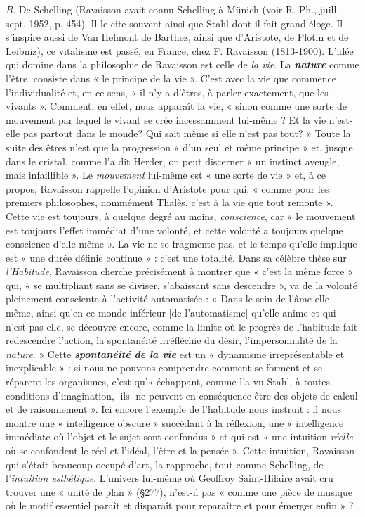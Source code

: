 {\it B.} De Schelling
{\scriptsize (Ravaisson avait connu Schelling à Münich (voir R. Ph., juill.-sept. 1952, p. 454).
Il le cite souvent ainsi que Stahl dont il fait grand éloge. Il s’inspire aussi de Van Helmont
de Barthez, ainsi que d’Aristote, de Plotin et de Leibniz)},
ce vitalisme est passé, en France, chez F. Ravaisson
(1813-1900). L'idée qui domine dans la philosophie de Ravaisson
est celle de {\it la vie}. La \textbf{\textit {nature}} comme l’être, consiste dans « le principe
de la vie ». C’est avec la vie que commence l’individualité et, en ce
sens, « il n’y a d’êtres, à parler exactement, que les vivants ». Comment,
en effet, nous apparaît la vie, « sinon comme une sorte de mouvement
par lequel le vivant se crée incessamment lui-même ? Et la vie
n'est-elle pas partout dans le monde? Qui sait même si elle n’est pas
tout? » Toute la suite des êtres n’est que la progression « d’un seul et
même principe » et, jusque dans le cristal, comme l’a dit Herder, on
peut discerner « un instinct aveugle, mais infaillible ». Le {\it mouvement}
lui-même est « une sorte de vie » et, à ce propos, Ravaisson rappelle
l’opinion d’Aristote pour qui, « comme pour les premiers philosophes,
nommément Thalès, c’est à la vie que tout remonte ». Cette vie est
toujours, à quelque degré au moins, {\it conscience}, car « le mouvement
est toujours l'effet immédiat d’une volonté, et cette volonté a toujours
quelque conscience d’elle-même ». La vie ne se fragmente pas,
et le temps qu’elle implique est « une durée définie continue » : c’est
une totalité. Dans sa célèbre thèse sur {\it l’Habitude}, Ravaisson
cherche précisément à montrer que « c’est la même force » qui, « se
multipliant sans se diviser, s’abaissant sans descendre », va de la
volonté pleinement consciente à l’activité automatisée : « Dans le
sein de l’âme elle-même, ainsi qu’en ce monde inférieur [de l’automatisme]
qu’elle anime et qui n’est pas elle, se découvre encore, comme
la limite où le progrès de l'habitude fait redescendre l’action, la
spontanéité irréfléchie du désir, l’impersonnalité de la {\it nature}. »
Cette \textbf{\textit {spontanéité de la vie}} est un « dynamisme irreprésentable et
inexplicable » : si nous ne pouvons comprendre comment se forment
et se réparent les organismes, c’est qu’« échappant, comme l’a vu Stahl,
à toutes conditions d'imagination, [ils] ne peuvent en conséquence
être des objets de calcul et de raisonnement ». Ici encore l'exemple
de l’habitude nous instruit : il nous montre une « intelligence obscure »
succédant à la réflexion, une « intelligence immédiate où l’objet et le
sujet sont confondus » et qui est « une intuition {\it réelle} où se confondent
le réel et l’idéal, l'être et la pensée ». Cette intuition, Ravaisson qui
s’était beaucoup occupé d’art, la rapproche, tout comme Schelling, de
l'{\it intuition esthétique}. L'univers lui-même où Geoffroy Saint-Hilaire
avait cru trouver une « unité de plan » (\S277), n’est-il pas « comme une
pièce de musique où le motif essentiel paraît et disparaît pour reparaître
et pour émerger enfin » ?

